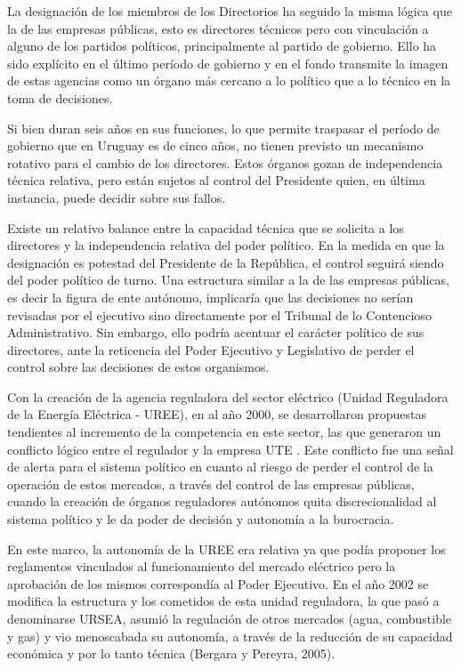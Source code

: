 \documentclass[
  12pt,
  spanish,
]{book}
\begin{document}
La designación de los miembros de los Directorios ha seguido la misma
lógica que la de las empresas públicas, esto es directores técnicos pero
con vinculación a alguno de los partidos políticos, principalmente al
partido de gobierno. Ello ha sido explícito en el último período de
gobierno y en el fondo transmite la imagen de estas agencias como un
órgano más cercano a lo político que a lo técnico en la toma de
decisiones.

Si bien duran seis años en sus funciones, lo que permite traspasar el
período de gobierno que en Uruguay es de cinco años, no tienen previsto
un mecanismo rotativo para el cambio de los directores. Estos órganos
gozan de independencia técnica relativa, pero están sujetos al control
del Presidente quien, en última instancia, puede decidir sobre sus
fallos.

Existe un relativo balance entre la capacidad técnica que se solicita a
los directores y la independencia relativa del poder político. En la
medida en que la designación es potestad del Presidente de la República,
el control seguirá siendo del poder político de turno. Una estructura
similar a la de las empresas públicas, es decir la figura de ente
autónomo, implicaría que las decisiones no serían revisadas por el
ejecutivo sino directamente por el Tribunal de lo Contencioso
Administrativo. Sin embargo, ello podría acentuar el carácter político
de sus directores, ante la reticencia del Poder Ejecutivo y Legislativo
de perder el control sobre las decisiones de estos organismos.

Con la creación de la agencia reguladora del sector eléctrico (Unidad
Reguladora de la Energía Eléctrica - UREE), en al año 2000, se
desarrollaron propuestas tendientes al incremento de la competencia en
este sector, las que generaron un conflicto lógico entre el regulador y
la empresa UTE \citep{Bergara2005}. Este conflicto fue una señal de
alerta para el sistema político en cuanto al riesgo de perder el control
de la operación de estos mercados, a través del control de las empresas
públicas, cuando la creación de órganos reguladores autónomos quita
discrecionalidad al sistema político y le da poder de decisión y
autonomía a la burocracia.

En este marco, la autonomía de la UREE era relativa ya que podía
proponer los reglamentos vinculados al funcionamiento del mercado
eléctrico pero la aprobación de los mismos correspondía al Poder
Ejecutivo. En el año 2002 se modifica la estructura y los cometidos de
esta unidad reguladora, la que pasó a denominarse URSEA, asumió la
regulación de otros mercados (agua, combustible y gas) y vio menoscabada
su autonomía, a través de la reducción de su capacidad económica y por
lo tanto técnica (Bergara y Pereyra, 2005).
\end{document}
